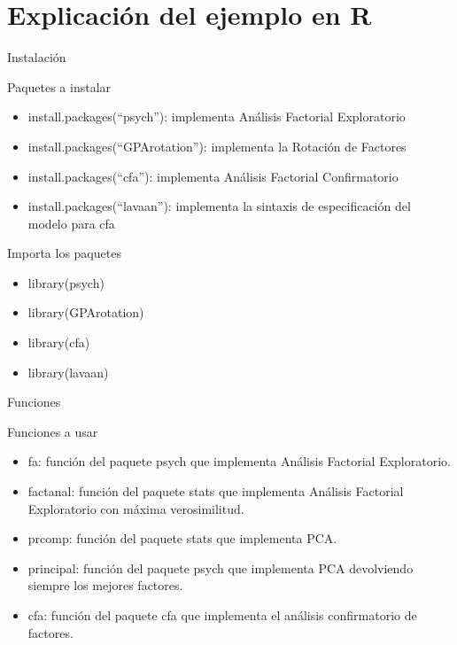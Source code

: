 \documentclass[10pt]{beamer}
\begin{document}
\section{Explicación del ejemplo en R}

\begin{frame}[fragile]{Instalación}
	\vspace{10px}
	\begin{block}{Paquetes a instalar}
		\begin{itemize}
			\item install.packages(``psych''): implementa Análisis Factorial Exploratorio
			\item install.packages(``GPArotation''): implementa la Rotación de Factores
			\item install.packages(``cfa''): implementa Análisis Factorial Confirmatorio
			\item install.packages(``lavaan''): implementa la sintaxis de especificación del modelo para cfa
		\end{itemize}
	\end{block}
	\vspace{10px}
	\begin{alertblock}{Importa los paquetes}
		\begin{itemize}
			\item library(psych)
			\item library(GPArotation)
			\item library(cfa)
			\item library(lavaan)
		\end{itemize}
	\end{alertblock}
\end{frame}

\begin{frame}[fragile]{Funciones}
\vspace{10px}
\begin{block}{Funciones a usar}
	\begin{itemize}
		\item fa: función del paquete psych que implementa Análisis Factorial Exploratorio.
		\item factanal: función del paquete stats que implementa Análisis Factorial Exploratorio con máxima verosimilitud.
		\item prcomp: función del paquete stats que implementa PCA.
		\item principal: función del paquete psych que implementa PCA devolviendo siempre los mejores factores.
		\item cfa: función del paquete cfa que implementa el análisis confirmatorio de factores.
	\end{itemize}
\end{block}
\end{frame}
\end{document}
